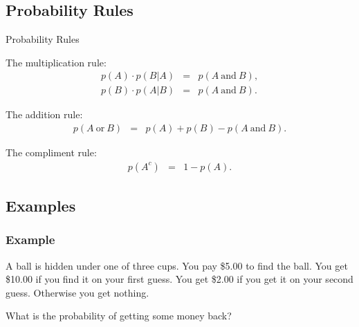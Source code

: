 \subsection{Probability Rules}

\begin{frame}{Probability Rules}

  \begin{definition}
    The multiplication rule:
    \begin{eqnarray*}
      p(A)\cdot p(B|A) & = & p(A \mathrm{~and~} B), \\
      p(B)\cdot p(A|B) & = & p(A \mathrm{~and~} B).
    \end{eqnarray*}

    The addition rule:
    \begin{eqnarray*}
      p(A \mathrm{~or~} B) & = & p(A) + p(B) - p(A \mathrm{~and~} B).
    \end{eqnarray*}

    The compliment rule:
    \begin{eqnarray*}
      p(A^c) & = & 1 - p(A).
    \end{eqnarray*}

  \end{definition}

  \vfill
  
\end{frame}


\subsection{Examples}

\begin{frame}
  \frametitle{Example}

  \vfill

  A ball is hidden under one of three cups. You pay \$5.00 to find the
  ball. You get \$10.00 if you find it on your first guess. You get
  \$2.00 if you get it on your second guess. Otherwise you get
  nothing.

  \vfill

  What is the probability of getting some money back?

  \vfill

\end{frame}


